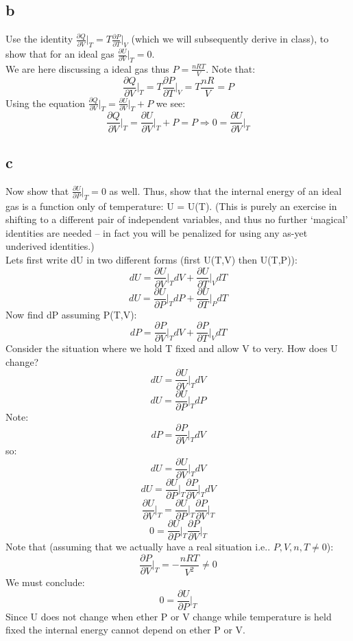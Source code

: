\documentclass[10pt,a4paper]{article}
\begin{document}
\subsection{b}
Use the identity $\frac{\partial Q}{\partial V}\biggr |_T=T\frac{\partial P}{\partial T}\biggr |_V$ (which we will subsequently derive in class), to show that for an ideal gas $\frac{\partial U}{\partial V}\biggr |_T=0$.\\

We are here discussing a ideal gas thus $P=\frac{nRT}{V}$.  Note that: $$\frac{\partial Q}{\partial V}\biggr |_T=T\frac{\partial P}{\partial T}\biggr |_V=T\frac{nR}{V}=P$$
Using the equation $\frac{\partial Q}{\partial V}\biggr |_T=\frac{\partial U}{\partial V}\biggr |_T+P$ we see:
$$\frac{\partial Q}{\partial V}\biggr |_T=\frac{\partial U}{\partial V}\biggr |_T+P =P\Rightarrow0=\frac{\partial U}{\partial V}\biggr |_T$$
\subsection{c}
Now show that $\frac{\partial U}{\partial P}\biggr |_T=0$ as well.  Thus, show that the internal energy of an ideal gas is a function only of temperature: U = U(T). (This is purely an exercise in shifting to a different pair of independent variables, and thus no further ‘magical’ identities are needed – in fact you will be penalized for using any as-yet underived identities.)\\

Lets first write dU in two different forms (first U(T,V) then U(T,P)):
$$dU=\frac{\partial U}{\partial V}\biggr |_TdV +\frac{\partial U}{\partial T}\biggr |_VdT$$
$$dU=\frac{\partial U}{\partial P}\biggr |_TdP +\frac{\partial U}{\partial T}\biggr |_PdT$$
Now find dP assuming P(T,V):
$$dP=\frac{\partial P}{\partial V}\biggr |_TdV +\frac{\partial P}{\partial T}\biggr |_VdT$$
Consider the situation where we hold T fixed and allow V to very.  How does U change?
$$dU=\frac{\partial U}{\partial V}\biggr |_TdV$$
$$dU=\frac{\partial U}{\partial P}\biggr |_TdP$$
Note:
$$dP=\frac{\partial P}{\partial V}\biggr |_TdV$$
so:
$$dU=\frac{\partial U}{\partial V}\biggr |_TdV$$
$$dU=\frac{\partial U}{\partial P}\biggr |_T\frac{\partial P}{\partial V}\biggr |_TdV$$
$$\frac{\partial U}{\partial V}\biggr |_T=\frac{\partial U}{\partial P}\biggr |_T\frac{\partial P}{\partial V}\biggr |_T$$
$$0=\frac{\partial U}{\partial P}\biggr |_T\frac{\partial P}{\partial V}\biggr |_T$$
Note that (assuming that we actually have a real situation i.e.. $P,V,n,T\neq0$):
$$\frac{\partial P}{\partial V}\biggr |_T=-\frac{nRT}{V^2}\neq 0$$
We must conclude:
$$0=\frac{\partial U}{\partial P}\biggr |_T$$
Since U does not change when ether P or V change while temperature is held fixed the internal energy cannot depend on ether P or V.
\end{document}
